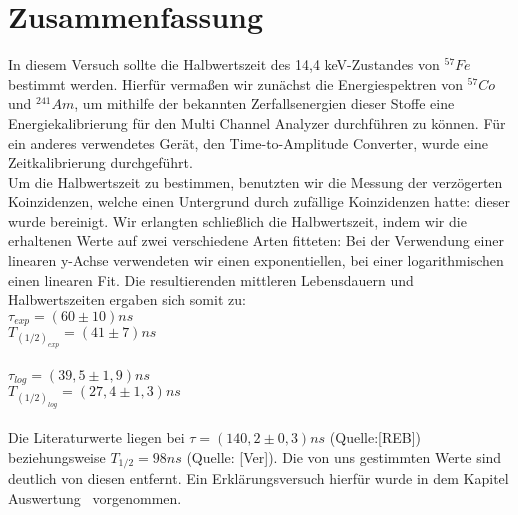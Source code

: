 \clearpage
\section{Zusammenfassung}
In diesem Versuch sollte die Halbwertszeit des 14,4 keV-Zustandes von $^{57}Fe$ bestimmt werden. Hierfür vermaßen wir zunächst die Energiespektren von $^{57}Co$ und $^{241}Am$, um mithilfe der bekannten Zerfallsenergien dieser Stoffe eine Energiekalibrierung für den Multi Channel Analyzer durchführen zu können. Für ein anderes verwendetes Gerät, den Time-to-Amplitude Converter, wurde eine Zeitkalibrierung durchgeführt.\\
Um die Halbwertszeit zu bestimmen, benutzten wir die Messung der verzögerten Koinzidenzen, welche einen Untergrund durch zufällige Koinzidenzen hatte: dieser wurde bereinigt. Wir erlangten schließlich die Halbwertszeit, indem wir die erhaltenen Werte auf zwei verschiedene Arten fitteten: Bei der Verwendung einer linearen y-Achse verwendeten wir einen exponentiellen, bei einer logarithmischen einen linearen Fit. Die resultierenden mittleren Lebensdauern und Halbwertszeiten ergaben sich somit zu:\\
$\tau_{exp}=(60\pm10)ns$\\
$T_{(1/2)_{exp}}=(41\pm7)ns$\\
~\\
$\tau_{log}=(39,5\pm1,9)ns$\\
$T_{(1/2)_{log}}=(27,4\pm1,3)ns$\\
~\\
Die Literaturwerte liegen bei $\tau=(140,2\pm0,3)ns$ (Quelle:[REB]) beziehungsweise $T_{1/2}=98 ns$ (Quelle: [Ver]). Die von uns gestimmten Werte sind deutlich von diesen entfernt. Ein Erklärungsversuch hierfür wurde in dem Kapitel \glqq Auswertung\grqq ~ vorgenommen.

